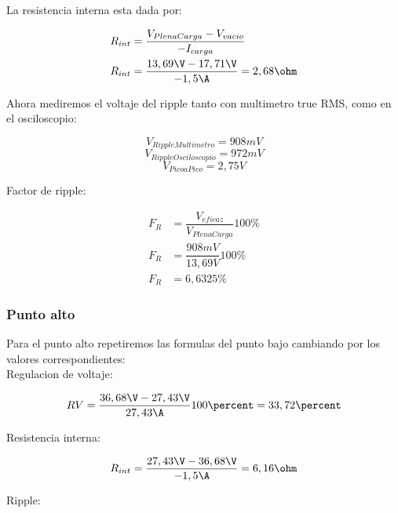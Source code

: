 La resistencia interna esta dada por:

\begin{equation}
  \begin{aligned}
    R_{int} &= \dfrac{V_{PlenaCarga} - V_{vacio}}{-I_{carga}}\\
    R_{int} &= \dfrac{13,69\V - 17,71\V}{-1,5\A} = 2,68\ohm
  \end{aligned}
\end{equation}

Ahora mediremos el voltaje del ripple tanto con multimetro true RMS, como en el osciloscopio:

\begin{equation}
  V_{RippleMultimetro} = 908 mV
\end{equation}
\begin{equation}
  V_{RippleOsciloscopio} = 972 mV
\end{equation}
\begin{equation}
  V_{PicoaPico} = 2,75 V
\end{equation}

Factor de ripple:

\begin{equation}
  \begin{aligned}
    F_R &= \dfrac{V_{eficaz}}{V_{PlenaCarga}} 100\percent\\
    F_R &= \dfrac{908 mV}{13,69 V} 100\percent\\
    F_R &= 6,6325\percent
  \end{aligned}
\end{equation}

\subsubsection{Punto alto}
Para el punto alto repetiremos las formulas del punto bajo cambiando por los valores correspondientes: \\

Regulacion de voltaje:

\begin{equation}
  RV = \dfrac{36,68\V - 27,43\V}{27,43\A} 100\percent = 33,72\percent
\end{equation}

Resistencia interna:

\begin{equation}
  R_{int} = \dfrac{27,43\V - 36,68\V}{-1,5\A} = 6,16\ohm
\end{equation}

Ripple:

